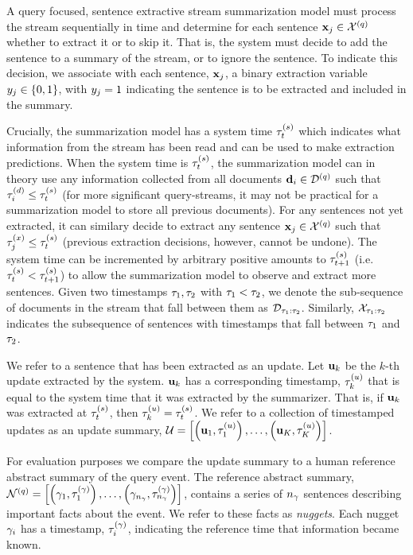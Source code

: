A query focused, sentence extractive stream summarization model must process
the stream sequentially in time and determine for each sentence
$\mathbf{x}_j\in \mathcal{X}^{(q)}$ whether to extract it
or to skip it. That is, the system must decide to add the sentence to a summary of the stream, or to ignore
the sentence. To indicate this decision, we associate with each sentence, $\mathbf{x}_j$, a binary extraction
variable $y_j \in \{0,1\}$, with $y_j=1$ indicating the
sentence is to be extracted and included in the summary.  

Crucially, the summarization model has a system time $\tau^{(s)}_t$
which indicates what information from the stream has been read and can
be used to make extraction predictions. When the system time is $\tau^{(s)}_t$,
the summarization model can in theory use any information collected from all
documents $\mathbf{d}_i \in \mathcal{D}^{(q)}$ such that $\tau^{(d)}_i \le \tau^{(s)}_t$ (for more significant query-streams, it may not be practical for a summarization model to store all previous documents). For any sentences not yet extracted, it can similary decide to extract any sentence $\mathbf{x}_j \in \mathcal{X}^{(q)}$  
such that $\tau^{(x)}_j \le \tau^{(s)}_t$ (previous extraction decisions, however, cannot be undone). The system time can be incremented by arbitrary
positive amounts to $\tau^{(s)}_{t+1}$ (i.e. $\tau^{(s)}_t < \tau^{(s)}_{t+1}$) to allow the summarization model to observe and extract more sentences.
Given two timestamps $\tau_1,\tau_2$ with $\tau_1 < \tau_2$, we denote the sub-sequence of documents in the stream that fall
between them as $\mathcal{D}_{\tau_1:\tau_2}$. Similarly, 
$\mathcal{X}_{\tau_1:\tau_2}$ indicates the subsequence of 
sentences with timestamps that fall between $\tau_1$ and $\tau_2$.

We refer to a sentence that has been extracted as an update. Let
$\mathbf{u}_k$ be the $k$-th update extracted by the system.  $\mathbf{u}_k$
has a corresponding timestamp, $\tau^{(u)}_k$ that is equal to the
system time that it was extracted by the summarizer.  That is, if
$\mathbf{u}_k$ was extracted at $\tau^{(s)}_t$, then $\tau^{(u)}_k =
\tau^{(s)}_t$. We refer to a collection of timestamped updates as an update
summary, $\mathcal{U} = \left[ \left(\mathbf{u}_1,
\tau^{(u)}_1\right) ,\ldots,\left(\mathbf{u}_K, \tau^{(u)}_K
\right)\right]$.

For evaluation purposes we compare the update summary to a human reference
abstract summary of the query event. The reference abstract summary,
$\mathcal{N}^{(q)} = \left[ \left(\gamma_1, \tau^{(\gamma)}_1\right),
\ldots, \left(\gamma_{{n_\gamma}}, \tau^{(\gamma)}_{{n_\gamma}}\right)
\right]$, contains a series of ${n_\gamma}$ sentences describing important
facts about  the event. We refer to these facts as \textit{nuggets}. Each
nugget $\gamma_i$ has a timestamp, $\tau^{(\gamma)}_i$, indicating the
reference time that information became known.

